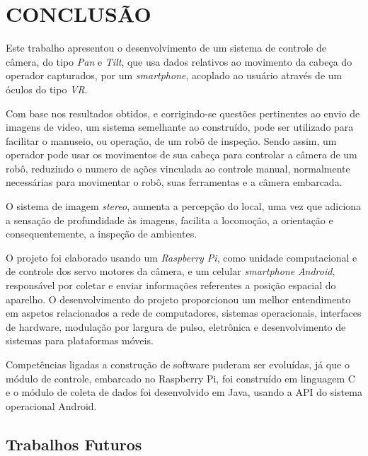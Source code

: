 
\chapter{CONCLUSÃO}
\label{chap:conclusao}

Este trabalho apresentou o desenvolvimento de um sistema de controle de câmera, do tipo \textit{Pan} e \textit{Tilt}, que usa dados relativos ao movimento da cabeça do operador capturados, por um \textit{smartphone}, acoplado ao usuário através de um óculos do tipo \textit{VR}.\par
Com base nos resultados obtidos, e corrigindo-se questões pertinentes ao envio de imagens de video, um sistema semelhante ao construído, pode ser utilizado para facilitar o manuseio, ou operação, de um robô de inspeção. Sendo assim, um operador pode usar os movimentos de sua cabeça para controlar a câmera de um robô, reduzindo o numero de ações vinculada ao controle manual, normalmente necessárias para movimentar o robô, suas ferramentas e a câmera embarcada. \par 
O sistema de imagem \textit{stereo}, aumenta a percepção do local, uma vez que adiciona a sensação de profundidade às imagens, facilita a locomoção, a orientação e consequentemente, a inspeção de ambientes.

O projeto foi elaborado usando um \textit{Raspberry Pi}, como unidade computacional e de controle dos servo motores da câmera, e um celular \textit{smartphone} \textit{Android}, responsável por coletar e enviar informações referentes a posição espacial do aparelho. O desenvolvimento do projeto proporcionou um melhor entendimento em aspetos relacionados a rede de computadores, sistemas operacionais, interfaces de hardware, modulação por largura de pulso, eletrônica e desenvolvimento de sistemas para plataformas móveis.\par

Competências ligadas a construção de software puderam ser evoluídas, já que o módulo de controle, embarcado no Raspberry Pi, foi construído em linguagem C e o módulo de coleta de dados foi desenvolvido em Java, usando a API do sistema operacional Android.\par

\section{Trabalhos Futuros}
\label{sec:trabalhosFuturos}

